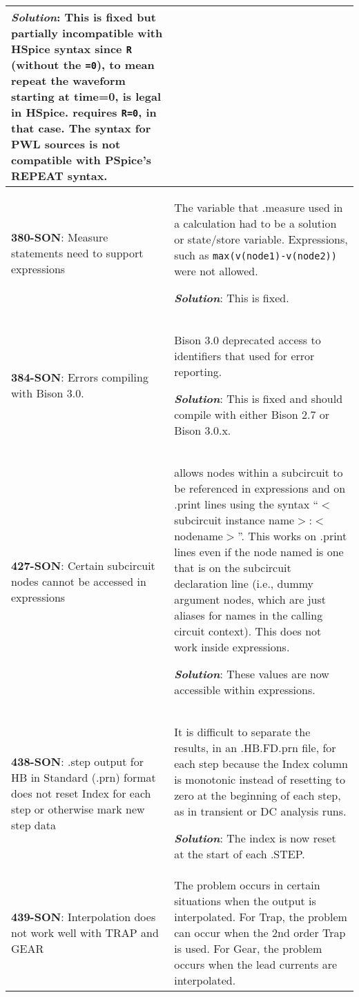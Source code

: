 \begin{longtable}[h] {>{\raggedright\small}m{2in}|>{\raggedright\let\\\tabularnewline\small}m{3.5in}}
\textbf{\textit{Solution}}: This is fixed but partially incompatible with
HSpice syntax since \texttt{R} (without the \texttt{=0}), to mean repeat the
waveform starting at time=0, is legal in HSpice.  \Xyce{} requires \texttt{R=0},
in that case. The \Xyce{} syntax for PWL sources is not compatible with
PSpice's REPEAT syntax.
\\ \hline 

\textbf{380-SON}: Measure statements need to support expressions &
The variable that .measure used in a calculation had to be a solution
or state/store variable.  Expressions, such as \texttt{max(v(node1)-v(node2))}
were not allowed.  

\textbf{\textit{Solution}}: This is fixed.
\\ \hline

\textbf{384-SON}: Errors compiling \Xyce{} with Bison 3.0.  &  Bison 3.0
deprecated access to identifiers that \Xyce{} used for error reporting.

\textbf{\textit{Solution}}: This is fixed and \Xyce{} should compile with
either Bison 2.7 or Bison 3.0.x.
\\ \hline

\textbf{427-SON}: Certain subcircuit nodes cannot be accessed in expressions &
\Xyce{} allows nodes within a subcircuit to be referenced in expressions and on
.print lines using the syntax ``$<$subcircuit instance
name$>$:$<$nodename$>$''.  This works on .print lines even if the node named is
one that is on the subcircuit declaration line (i.e., dummy argument nodes,
which are just aliases for names in the calling circuit context).  This does
not work inside expressions.

\textbf{\textit{Solution}}: These values are now accessible within expressions.
\\ \hline

\textbf{438-SON}: .step output for HB in Standard (.prn) format does not reset
Index for each step or otherwise mark new step data &  It is difficult to separate the results, 
in an .HB.FD.prn file, for each step because the Index column is monotonic instead of resetting
to zero at the beginning of each step, as in transient or DC analysis runs. 

\textbf{\textit{Solution}}: The index is now reset at the start of each .STEP.
\\ \hline


\textbf{439-SON}: Interpolation does not work well with TRAP and GEAR &
The problem occurs in certain situations when the output is interpolated. For
Trap, the problem can occur when the 2nd order Trap is used. For Gear, the
problem occurs when the lead currents are interpolated.


\end{longtable}
